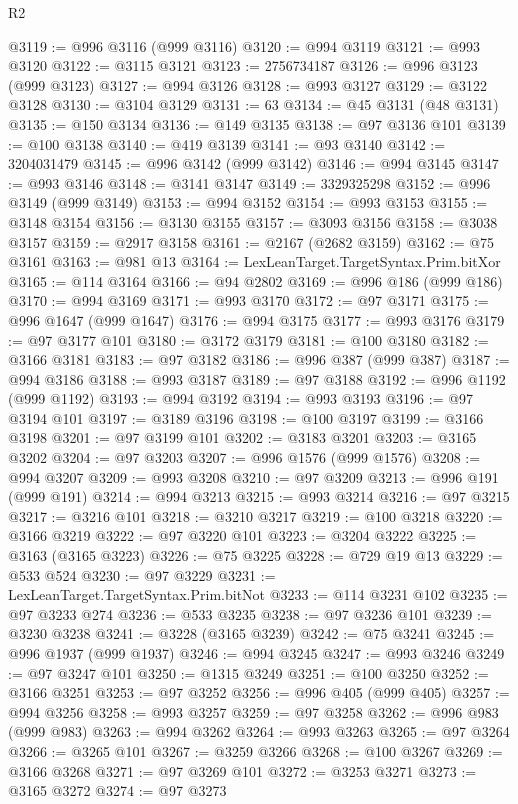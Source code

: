 \begin{lexlean}{R2}
\begin{coremodule}
@3119 := @996 @3116 (@999 @3116)
@3120 := @994 @3119
@3121 := @993 @3120
@3122 := @3115 @3121
@3123 := 2756734187
@3126 := @996 @3123 (@999 @3123)
@3127 := @994 @3126
@3128 := @993 @3127
@3129 := @3122 @3128
@3130 := @3104 @3129
@3131 := 63
@3134 := @45 @3131 (@48 @3131)
@3135 := @150 @3134
@3136 := @149 @3135
@3138 := @97 @3136 @101
@3139 := @100 @3138
@3140 := @419 @3139
@3141 := @93 @3140
@3142 := 3204031479
@3145 := @996 @3142 (@999 @3142)
@3146 := @994 @3145
@3147 := @993 @3146
@3148 := @3141 @3147
@3149 := 3329325298
@3152 := @996 @3149 (@999 @3149)
@3153 := @994 @3152
@3154 := @993 @3153
@3155 := @3148 @3154
@3156 := @3130 @3155
@3157 := @3093 @3156
@3158 := @3038 @3157
@3159 := @2917 @3158
@3161 := @2167 (@2682 @3159)
@3162 := @75 @3161
@3163 := @981 @13
@3164 := LexLeanTarget.TargetSyntax.Prim.bitXor
@3165 := @114 @3164
@3166 := @94 @2802
@3169 := @996 @186 (@999 @186)
@3170 := @994 @3169
@3171 := @993 @3170
@3172 := @97 @3171
@3175 := @996 @1647 (@999 @1647)
@3176 := @994 @3175
@3177 := @993 @3176
@3179 := @97 @3177 @101
@3180 := @3172 @3179
@3181 := @100 @3180
@3182 := @3166 @3181
@3183 := @97 @3182
@3186 := @996 @387 (@999 @387)
@3187 := @994 @3186
@3188 := @993 @3187
@3189 := @97 @3188
@3192 := @996 @1192 (@999 @1192)
@3193 := @994 @3192
@3194 := @993 @3193
@3196 := @97 @3194 @101
@3197 := @3189 @3196
@3198 := @100 @3197
@3199 := @3166 @3198
@3201 := @97 @3199 @101
@3202 := @3183 @3201
@3203 := @3165 @3202
@3204 := @97 @3203
@3207 := @996 @1576 (@999 @1576)
@3208 := @994 @3207
@3209 := @993 @3208
@3210 := @97 @3209
@3213 := @996 @191 (@999 @191)
@3214 := @994 @3213
@3215 := @993 @3214
@3216 := @97 @3215
@3217 := @3216 @101
@3218 := @3210 @3217
@3219 := @100 @3218
@3220 := @3166 @3219
@3222 := @97 @3220 @101
@3223 := @3204 @3222
@3225 := @3163 (@3165 @3223)
@3226 := @75 @3225
@3228 := @729 @19 @13
@3229 := @533 @524
@3230 := @97 @3229
@3231 := LexLeanTarget.TargetSyntax.Prim.bitNot
@3233 := @114 @3231 @102
@3235 := @97 @3233 @274
@3236 := @533 @3235
@3238 := @97 @3236 @101
@3239 := @3230 @3238
@3241 := @3228 (@3165 @3239)
@3242 := @75 @3241
@3245 := @996 @1937 (@999 @1937)
@3246 := @994 @3245
@3247 := @993 @3246
@3249 := @97 @3247 @101
@3250 := @1315 @3249
@3251 := @100 @3250
@3252 := @3166 @3251
@3253 := @97 @3252
@3256 := @996 @405 (@999 @405)
@3257 := @994 @3256
@3258 := @993 @3257
@3259 := @97 @3258
@3262 := @996 @983 (@999 @983)
@3263 := @994 @3262
@3264 := @993 @3263
@3265 := @97 @3264
@3266 := @3265 @101
@3267 := @3259 @3266
@3268 := @100 @3267
@3269 := @3166 @3268
@3271 := @97 @3269 @101
@3272 := @3253 @3271
@3273 := @3165 @3272
@3274 := @97 @3273

\end{coremodule}
\end{lexlean}
